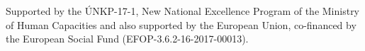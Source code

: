 
	
	Supported by the ÚNKP-17-1,	New National Excellence Program of the Ministry of Human Capacities and also supported by the European Union, co-financed by the
	European Social Fund (EFOP-3.6.2-16-2017-00013).
	
